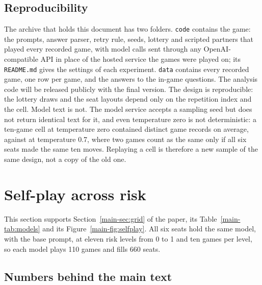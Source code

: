 \documentclass[10pt]{article}
\let\plainsubsection\subsection
\renewcommand{\subsection}{\FloatBarrier\needspace{8\baselineskip}\plainsubsection}
\let\plainsection\section
\renewcommand{\section}{\FloatBarrier\needspace{12\baselineskip}\plainsection}  %
\begin{document}
\subsection{Reproducibility}
\label{sec:repro}

The archive that holds this document has two folders. \texttt{code} contains the game: the prompts, answer parser, retry rule, seeds, lottery and scripted partners that played every recorded game, with model calls sent through any OpenAI-compatible API in place of the hosted service the games were played on; its \texttt{README.md} gives the settings of each experiment. \texttt{data} contains every recorded game, one row per game, and the answers to the in-game questions. The analysis code will be released publicly with the final version. The design is reproducible: the lottery draws and the seat layouts depend only on the repetition index and the cell. Model text is not. The model service accepts a sampling seed but does not return identical text for it, and even temperature zero is not deterministic: a ten-game cell at temperature zero contained \RobTempZeroDistinct{} distinct game records on average, against \RobTempZeroBaseDistinct{} at temperature 0.7, where two games count as the same only if all six seats made the same ten moves. Replaying a cell is therefore a new sample of the same design, not a copy of the old one.

\section{Self-play across risk}
\label{sec:selfplay}

This section supports Section~\ref{main-sec:grid} of the paper, its Table~\ref{main-tab:models} and its Figure~\ref{main-fig:selfplay}. All six seats hold the same model, with the base prompt, at eleven risk levels from 0 to 1 and ten games per level, so each model plays 110 games and fills 660 seats.

\subsection{Numbers behind the main text}
\end{document}
